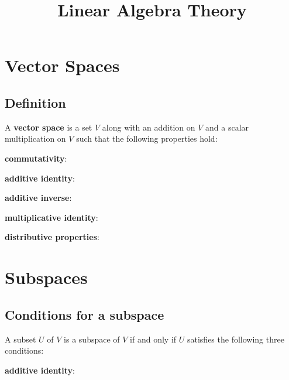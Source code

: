 \documentclass{article}
\begin{document}
\title{Linear Algebra Theory}

\setlength{\textwidth}{1000pt}

\hspace{10pt}

\section{Vector Spaces}
\subsection{Definition}

A \textbf{vector space} is a set $V$ along with an addition on $V$ and a scalar multiplication on $V$ such that the following properties hold:
\vspace{10pt}

\textbf{commutativity}: \hspace{57pt}{$u+v = v+u$ for all $u, v \in V$}

\textbf{additive identity}: \hspace{48pt}{there exists an element $v \in V$ such that $v+0=v$ for all $v\in V$}

\textbf{additive inverse}: \hspace{53pt}{for every $v\in V$, there exists $w\in V$ such that $v+w=0$}

\textbf{multiplicative identity}: \hspace{20pt}{$1v=v$ for all $v \in V$}

\textbf{distributive properties}: \hspace{20pt}{$a(u+v)=au+av$ and $(a+b)v=av+bv$ for all $a,b \in F$ and all $u,v\in V$}


\section{Subspaces}
\subsection{Conditions for a subspace}

A subset $U$ of $V$ is a subspace of $V$ if and only if $U$ satisfies the following three conditions:
\vspace{10pt}

    \textbf{additive identity}:  \hspace{95pt}{$0 \in U$}
    
\end{document}
